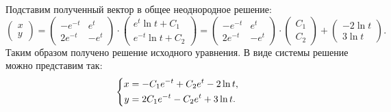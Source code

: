 		Подставим полученный вектор в общее неоднородное решение:
		\[ \begin{pmatrix} x \\ y \end{pmatrix} = \begin{pmatrix} -e^{-t} & e^{t} \\ 2e^{-t} & -e^{t} \end{pmatrix} \cdot \begin{pmatrix} e^{t} \ln{t} + C_1 \\ e^{-t} \ln{t} + C_2 \end{pmatrix} = \begin{pmatrix} -e^{-t} & e^{t} \\ 2e^{-t} & -e^{t} \end{pmatrix} \cdot \begin{pmatrix} C_1 \\ C_2 \end{pmatrix} + \begin{pmatrix} -2 \ln{t} \\ 3 \ln{t} \end{pmatrix}. \]
		Таким образом получено решение исходного уравнения. В виде системы решение можно представим так:
		\[ \left\lbrace \begin{aligned} x &= -C_1 e^{-t} + C_2 e^{t} - 2 \ln{t}, \\ y &= 2C_1 e^{-t} - C_2 e^{t} + 3 \ln{t}.  \end{aligned} \right. \]
